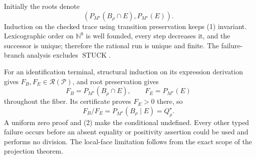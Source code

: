 Initially the roots denote
\[
(P_{M^\star}(B_\rho\cap E),P_{M^\star}(E)).
\tag{1}
\]
Induction on the checked trace using transition preservation keeps (1) invariant.  Lexicographic order on \(\mathbb N^8\) is well founded, every step decreases it, and the successor is unique; therefore the rational run is unique and finite.  The failure-branch analysis excludes \(\operatorname{STUCK}\).

For an identification terminal, structural induction on its expression derivation gives \(F_B,F_E\in\mathscr R(\mathcal P)\), and root preservation gives
\[
F_B=P_{M^\star}(B_\rho\cap E),\qquad F_E=P_{M^\star}(E)
\tag{2}
\]
throughout the fiber.  Its certificate proves \(F_E>0\) there, so
\[
F_B/F_E=P_{M^\star}(B_\rho\mid E)=Q_\rho^\star.
\]
A uniform zero proof and (2) make the conditional undefined.  Every other typed failure occurs before an absent equality or positivity assertion could be used and performs no division.  The local-face limitation follows from the exact scope of the projection theorem.